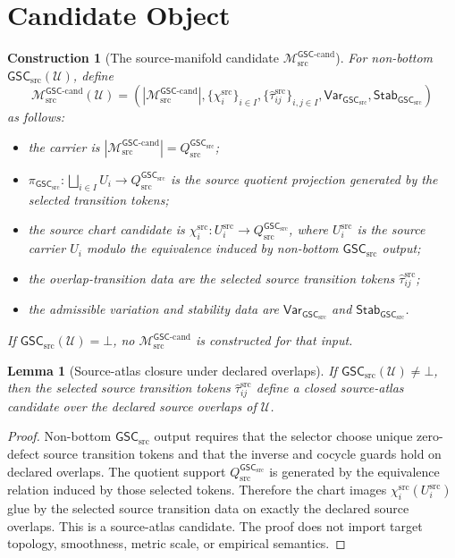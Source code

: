 \documentclass[11pt]{article}
\newcommand{\Mgsccand}{\mathcal{M}_{\mathrm{src}}^{\mathsf{GSC}\text{-}\mathrm{cand}}}
\newcommand{\GSC}{\mathsf{GSC}_{\mathrm{src}}}
\newcommand{\Vargsc}{\mathsf{Var}_{\GSC}}
\newcommand{\Stabgsc}{\mathsf{Stab}_{\GSC}}
\newcommand{\Qsrc}{Q_{\mathrm{src}}^{\GSC}}
\newcommand{\Tau}{\widehat{\tau}^{\mathrm{src}}}
\newcommand{\Bot}{\bot}
\newtheorem{construction}{Construction}
\newtheorem{lemma}{Lemma}
\begin{document}
\section{Candidate Object}

\begin{construction}[The source-manifold candidate \(\Mgsccand\)]
For non-bottom \(\GSC(\mathcal U)\), define
\[
  \Mgsccand(\mathcal U)
  =
  \left(
    |\Mgsccand|,
    \{\chi_i^{\mathrm{src}}\}_{i\in I},
    \{\Tau_{ij}\}_{i,j\in I},
    \Vargsc,
    \Stabgsc
  \right)
\]
as follows:
\begin{itemize}
  \item the carrier is \(|\Mgsccand|=\Qsrc\);
  \item \(\pi_{\GSC}:\bigsqcup_{i\in I}U_i\to\Qsrc\) is the source quotient
  projection generated by the selected transition tokens;
  \item the source chart candidate is
  \(\chi_i^{\mathrm{src}}:U_i^{\mathrm{src}}\to \Qsrc\), where
  \(U_i^{\mathrm{src}}\) is the source carrier \(U_i\) modulo the equivalence
  induced by non-bottom \(\GSC\) output;
  \item the overlap-transition data are the selected source transition tokens
  \(\Tau_{ij}\);
  \item the admissible variation and stability data are \(\Vargsc\) and
  \(\Stabgsc\).
\end{itemize}
If \(\GSC(\mathcal U)=\Bot\), no \(\Mgsccand\) is constructed for that input.
\end{construction}

\begin{lemma}[Source-atlas closure under declared overlaps]
If \(\GSC(\mathcal U)\neq\Bot\), then the selected source transition tokens
\(\Tau_{ij}\) define a closed source-atlas candidate over the declared source
overlaps of \(\mathcal U\).
\end{lemma}

\begin{proof}
Non-bottom \(\GSC\) output requires that the selector choose unique
zero-defect source transition tokens and that the inverse and cocycle guards
hold on declared overlaps. The quotient support \(\Qsrc\) is generated by
the equivalence relation induced by those selected tokens. Therefore the
chart images \(\chi_i^{\mathrm{src}}(U_i^{\mathrm{src}})\) glue by the
selected source transition data on exactly the declared source overlaps. This
is a source-atlas candidate. The proof does not import target topology,
smoothness, metric scale, or empirical semantics.
\end{proof}
\end{document}

